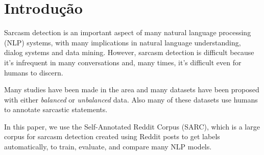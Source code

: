 

\chapter{Introdução}%
\label{cha:introducao}

Sarcasm detection is an important aspect of many natural language processing
(NLP) systems, with many implications in natural language understanding, dialog
systems and data mining. However, sarcasm detection is difficult because it's
infrequent in many conversations and, many times, it's difficult even for humans
to discern.

Many studies have been made in the area and many datasets have been proposed
with either \textit{balanced} or \textit{unbalanced} data. Also many of these
datasets use humans to annotate sarcastic statements.

In this paper, we use the Self-Annotated Reddit Corpus (SARC), which is a large
corpus for sarcasm detection created using Reddit posts to get labels
automatically, to train, evaluate, and compare many NLP models.
